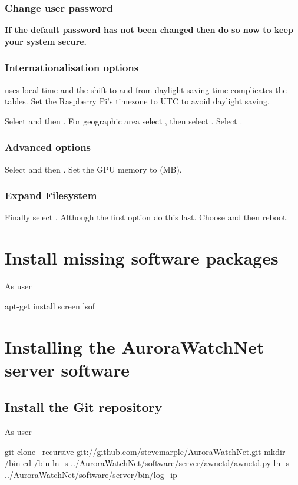 \subsubsection{Change user password}
\textbf{If the default password has not been changed then do so now to keep
your system secure.}

\subsubsection{Internationalisation options}
 uses local time and the shift to and from daylight
saving time complicates the  tables. Set the Raspberry
Pi's timezone to UTC to avoid daylight saving.

Select  and
then . For geographic area select %
, then select . Select .

\subsubsection{Advanced options}
Select  and then . Set the GPU memory to  (MB).

\subsubsection{Expand Filesystem}
Finally select . Although the first option
do this last. Choose  and then reboot.

\section{Install missing software packages}
As user \rootUser
\begin{Cmd}
apt-get install screen lsof
\end{Cmd}

\section{Installing the AuroraWatchNet server software}

\subsection{Install the Git repository}
As user \piUser
\begin{Cmd}
git clone --recursive git://github.com/stevemarple/AuroraWatchNet.git
mkdir \mytilde/bin
cd \mytilde/bin
ln -s ../AuroraWatchNet/software/server/awnetd/awnetd.py
ln -s ../AuroraWatchNet/software/server/bin/log_ip
\end{Cmd}

